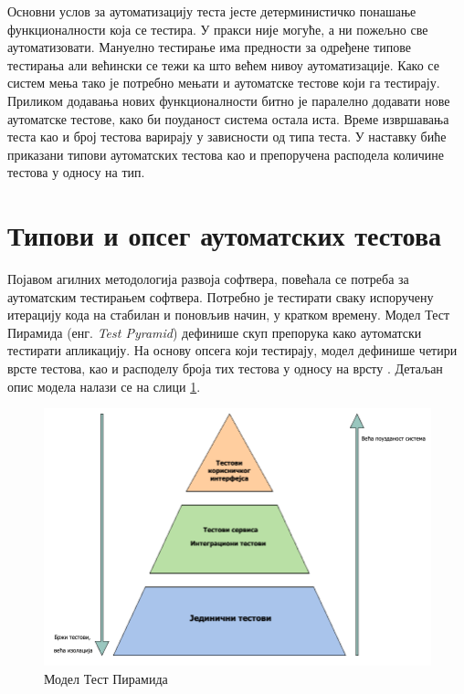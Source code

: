 \documentclass[12pt,oneside]{memoir}
\begin{document}
Основни услов за аутоматизацију теста јесте детерминистичко понашање функционалности која се тестира. У пракси није могуће, а ни пожељно све аутоматизовати. Мануелно тестирање има предности за одређене типове тестирања али већински се тежи ка што већем нивоу аутоматизације. Како се систем мења тако је потребно мењати и аутоматске тестове који га тестирају. Приликом додавања нових функционалности битно је паралелно додавати нове аутоматске тестове, како би поуданост система остала иста. Време извршавања теста као и број тестова варирају у зависности од типа теста. У наставку биће приказани типови аутоматских тестова као и препоручена расподела количине тестова у односу на тип.


\section{Типови и опсег аутоматских тестова}

Појавом агилних методологија развоја софтвера, повећала се потреба за аутоматским тестирањем софтвера. Потребно је тестирати сваку испоручену итерацију кода на стабилан и поновљив начин, у кратком времену. Модел Тест Пирамида (енг. \textit{Test Pyramid}) дефинише скуп препорука како аутоматски тестирати апликацију. На основу опсега који тестирају, модел дефинише четири врсте тестова, као и расподелу броја тих тестова у односу на врсту \cite{microservicesBook}. 
Детаљан опис модела налази се на слици \ref{fig:piramida}.

\begin{figure}[!ht]
  \centering
  \includegraphics[width=1\textwidth]{matfmaster/img/piramida.png}
  \caption{Модел Тест Пирамида}
  \label{fig:piramida}
\end{figure}
\end{document}
